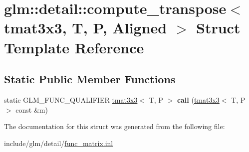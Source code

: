 \hypertarget{structglm_1_1detail_1_1compute__transpose_3_01tmat3x3_00_01T_00_01P_00_01Aligned_01_4}{}\section{glm\+:\+:detail\+:\+:compute\+\_\+transpose$<$ tmat3x3, T, P, Aligned $>$ Struct Template Reference}
\label{structglm_1_1detail_1_1compute__transpose_3_01tmat3x3_00_01T_00_01P_00_01Aligned_01_4}
\subsection*{Static Public Member Functions}
\begin{DoxyCompactItemize}
\item 
\mbox{\label{structglm_1_1detail_1_1compute__transpose_3_01tmat3x3_00_01T_00_01P_00_01Aligned_01_4_af13763319f17595e7e84755b881aab95}} 
static G\+L\+M\+\_\+\+F\+U\+N\+C\+\_\+\+Q\+U\+A\+L\+I\+F\+I\+ER \hyperlink{structglm_1_1tmat3x3}{tmat3x3}$<$ T, P $>$ {\bfseries call} (\hyperlink{structglm_1_1tmat3x3}{tmat3x3}$<$ T, P $>$ const \&m)
\end{DoxyCompactItemize}


The documentation for this struct was generated from the following file\+:\begin{DoxyCompactItemize}
\item 
include/glm/detail/\hyperlink{func__matrix_8inl}{func\+\_\+matrix.\+inl}\end{DoxyCompactItemize}
